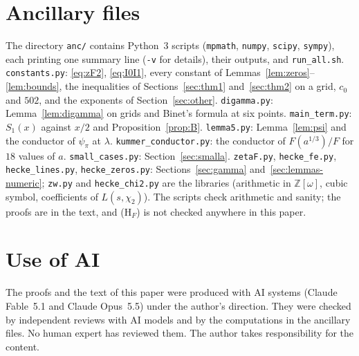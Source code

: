 \documentclass[11pt]{article}
\theoremstyle{definition}
\theoremstyle{remark}
\numberwithin{equation}{section}
\newcommand{\Z}{\mathbb Z}
\newcommand{\HF}{\textup{(H$_F$)}}
\begin{document}
\section{Ancillary files}\label{sec:anc}
The directory \texttt{anc/} contains Python~3 scripts (\texttt{mpmath}, \texttt{numpy}, \texttt{scipy}, \texttt{sympy}), each printing one summary line (\texttt{-v} for details), their outputs, and \texttt{run\_all.sh}. \texttt{constants.py}: \eqref{eq:zF2}, \eqref{eq:I0I1}, every constant of Lemmas~\ref{lem:zeros}--\ref{lem:bounds}, the inequalities of Sections~\ref{sec:thm1} and~\ref{sec:thm2} on a grid, $c_0$ and $502$, and the exponents of Section~\ref{sec:other}. \texttt{digamma.py}: Lemma~\ref{lem:digamma} on grids and Binet's formula at six points. \texttt{main\_term.py}: $S_1(x)$ against $x/2$ and Proposition~\ref{prop:B}. \texttt{lemma5.py}: Lemma~\ref{lem:psi} and the conductor of $\psi_\pi$ at $\lambda$. \texttt{kummer\_conductor.py}: the conductor of $F(a^{1/3})/F$ for $18$ values of $a$. \texttt{small\_cases.py}: Section~\ref{sec:smalla}. \texttt{zetaF.py}, \texttt{hecke\_fe.py}, \texttt{hecke\_lines.py}, \texttt{hecke\_zeros.py}: Sections~\ref{sec:gamma} and~\ref{sec:lemmas-numeric}; \texttt{zw.py} and \texttt{hecke\_chi2.py} are the libraries (arithmetic in $\Z[\omega]$, cubic symbol, coefficients of $L(s,\chi_2)$). The scripts check arithmetic and sanity; the proofs are in the text, and \HF{} is not checked anywhere in this paper.

\begingroup\raggedright


\endgroup
\section*{Use of AI}
The proofs and the text of this paper were produced with AI systems (Claude Fable~5.1 and Claude Opus~5.5) under the author's direction. They were checked by independent reviews with AI models and by the computations in the ancillary files. No human expert has reviewed them. The author takes responsibility for the content.
\end{document}
